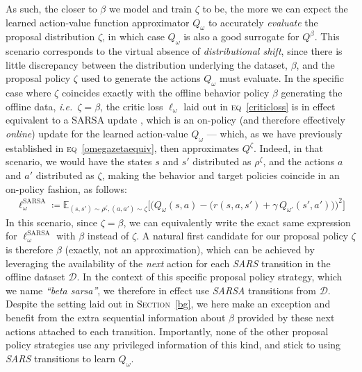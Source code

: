 As such, the closer to $\beta$ we model and train $\zeta$ to be,
the more we can expect the learned action-value function
approximator $Q_\omega$ to accurately \textit{evaluate} the proposal distribution $\zeta$,
in which case $Q_\omega$ is also a good surrogate for $Q^\beta$.
This scenario corresponds to the virtual absence of \emph{distributional shift},
since there is little discrepancy between the distribution underlying the dataset, $\beta$, and the proposal
policy $\zeta$ used to generate the actions $Q_\omega$ must evaluate.
In the specific case where $\zeta$ coincides exactly with the offline behavior policy $\beta$ generating the
offline data, \textit{i.e.}~$\zeta = \beta$,
the critic loss $\ell_\omega$ laid out in \textsc{eq}~\ref{criticloss}
is in effect equivalent to a SARSA update \cite{Rummery1994-qp, Thrun1995-sz, Sutton1996-ky, Van_Seijen2009-yw},
which is an on-policy (and therefore effectively \textit{online}) update
for the learned action-value $Q_\omega$
--- which, as we have previously established in \textsc{eq}~\ref{omegazetaequiv},
then approximates $Q^\zeta$.
Indeed, in that scenario, we would have the states $s$ and $s'$ distributed as $\rho^\zeta$,
and the actions $a$ and $a'$ distributed as $\zeta$,
making the behavior and target policies coincide in an on-policy fashion, as follows:
\begin{align}
  \ell^\text{SARSA}_\omega \coloneqq
  \mathbb{E}_{(s,s') \sim \rho^\zeta, (a,a') \sim \zeta}
  \bigg[
  \Big(
  Q_\omega(s,a) -
  \big(
  r(s, a, s') + \gamma \,
  Q_{\omega'}(s',a')
  \big)
  \Big)^2
  \bigg]
  \label{sarsaloss}
\end{align}
In this scenario, since $\zeta = \beta$, we can equivalently write the exact same expression for
$\ell^\text{SARSA}_\omega$ with $\beta$ instead of $\zeta$.
A natural first candidate for our proposal policy $\zeta$ is therefore $\beta$ (exactly, not an approximation),
which can be achieved by leveraging the availability of the \textit{next} action for each
\textit{SARS} transition in the offline dataset $\mathcal{D}$.
In the context of this specific proposal policy strategy, which we name \textit{``beta sarsa''},
we therefore in effect use \textit{SARSA} transitions from $\mathcal{D}$.
Despite the setting laid out in \textsc{Section}~\ref{bg},
we here make an exception and benefit from the extra sequential information about $\beta$ provided by
these next actions attached to each transition.
Importantly, none of the other proposal policy strategies use any privileged information of this kind,
and stick to using \textit{SARS} transitions to learn $Q_\omega$.
